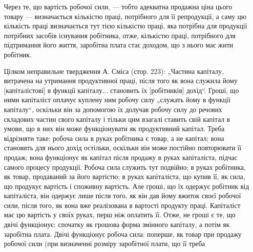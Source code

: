 Через те, що вартість робочої сили, — тобто адекватна продажна ціна цього товару — визначається
кількістю праці, потрібного для її репродукції, а саму цю кількість праці визначається тут тією
кількістю праці, яка потрібна для продукції потрібних засобів існування робітника, отже, кількістю
праці, потрібного для підтримання його життя, заробітна плата стає доходом, що з нього має жити
робітник.

Цілком неправильне твердження А. Сміса (стор. 223): „Частина капіталу, витрачена на утримання
продуктивної праці, після того як вона служила йому [капіталістові] в функції капіталу... становить
їх [робітників] дохід“. Гроші, що ними капіталіст оплачує куплену ним робочу силу „служать йому в
функції капіталу“, оскільки він за допомогою їх долучав робочу силу до речових складових частин
свого капіталу і тільки цим взагалі ставить свій капітал в умови, що в них він може функціонувати як
продуктивний капітал. Треба відрізняти таке: робоча сила в руках робітника є товар, а не капітал;
вона становить для нього дохід остільки, оскільки він може постійно повторювати її продаж; вона
функціонує як капітал після продажу в руках капіталіста, підчас самого процесу продукції. Робоча
сила служить тут подвійно; в руках робітника, як товар, продаваний за його вартістю; в руках
капіталіста, що купив її, як сила, що продукує вартість і споживну вартість. Але гроші, що їх
одержує робітник від капіталіста, він одержує лише після того, як він дав йому вжиток своєї робочої
сили, після того, як вона вже реалізована в вартості продукту праці. Капіталіст має цю вартість у
своїх руках,
перш ніж оплатить її. Отже, не гроші є те, що двічі функціонує: спочатку як грошова форма змінного
капіталу, а потім як заробітна плата. Двічі функціонує робоча сила: поперше, як товар при продажу
робочої сили (при визначенні розміру заробітної плати, що її треба
\parbreak{}  %
